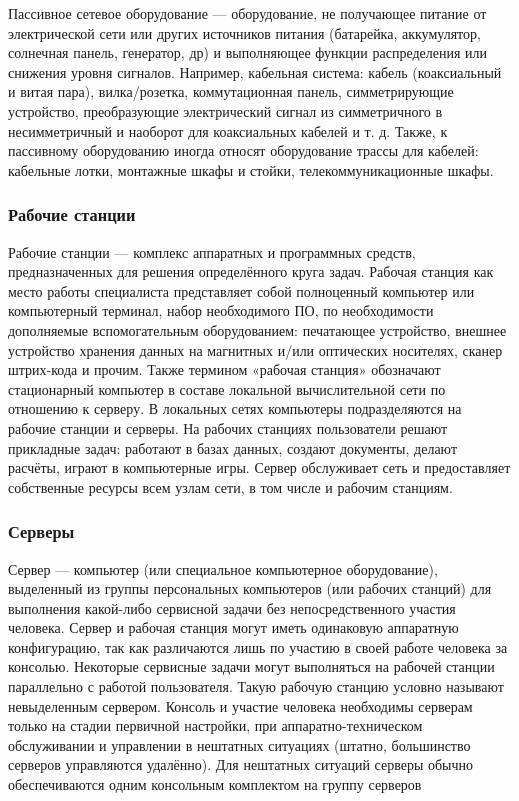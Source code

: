 Пассивное сетевое оборудование --- оборудование, не получающее питание от электрической сети или других источников питания (батарейка, аккумулятор, солнечная панель, генератор, др) и выполняющее функции распределения или снижения уровня сигналов. Например, кабельная система: кабель (коаксиальный и витая пара), вилка/розетка, коммутационная панель, симметрирующие устройство, преобразующие электрический сигнал из симметричного в несимметричный и наоборот для коаксиальных кабелей и т. д. Также, к пассивному оборудованию иногда относят оборудование трассы для кабелей: кабельные лотки, монтажные шкафы и стойки, телекоммуникационные шкафы.

\subsubsection{Рабочие станции}
Рабочие станции --- комплекс аппаратных и программных средств, предназначенных для решения определённого круга задач.
Рабочая станция как место работы специалиста представляет собой полноценный компьютер или компьютерный терминал, набор необходимого ПО, по необходимости дополняемые вспомогательным оборудованием: печатающее устройство, внешнее устройство хранения данных на магнитных и/или оптических носителях, сканер штрих-кода и прочим.
Также термином «рабочая станция» обозначают стационарный компьютер в составе локальной вычислительной сети по отношению к серверу. В локальных сетях компьютеры подразделяются на рабочие станции и серверы. На рабочих станциях пользователи решают прикладные задач: работают в базах данных, создают документы, делают расчёты, играют в компьютерные игры. Сервер обслуживает сеть и предоставляет собственные ресурсы всем узлам сети, в том числе и рабочим станциям.


\subsubsection{Серверы}
Сервер --- компьютер (или специальное компьютерное оборудование), выделенный из группы персональных компьютеров (или рабочих станций) для выполнения какой-либо сервисной задачи без непосредственного участия человека. Сервер и рабочая станция могут иметь одинаковую аппаратную конфигурацию, так как различаются лишь по участию в своей работе человека за консолью.
Некоторые сервисные задачи могут выполняться на рабочей станции параллельно с работой пользователя. Такую рабочую станцию условно называют невыделенным сервером.
Консоль и участие человека необходимы серверам только на стадии первичной настройки, при аппаратно-техническом обслуживании и управлении в нештатных ситуациях (штатно, большинство серверов управляются удалённо). Для нештатных ситуаций серверы обычно обеспечиваются одним консольным комплектом на группу серверов 

